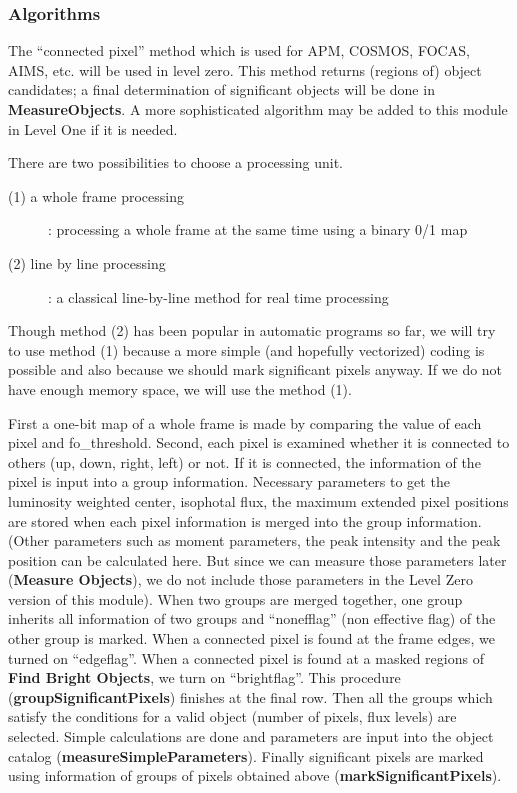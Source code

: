 \subsubsection {Algorithms}
The ``connected pixel'' method which is used for 
APM, COSMOS, FOCAS, AIMS, etc. will be used in level zero. 
This method returns (regions of) object candidates; 
a final determination of significant objects will be done in 
{\bf MeasureObjects}.  
A more sophisticated algorithm may be added to this module in
Level One if it is needed.

There are two possibilities to choose a processing unit.
\begin{description}
\item[\quad (1) a whole frame processing]:  processing a whole 
       frame at the same time using a binary 0/1 map 
\item[\quad (2) line by line processing]: a classical line-by-line 
        method for real time processing
\end{description}

Though method (2) has been popular in automatic programs so far, 
we will try to use method (1) because 
a more simple (and hopefully vectorized) coding is possible and also 
because we should mark significant pixels anyway. If we do not have 
enough memory space, we will use the method (1). 

First a one-bit map of a whole frame is made by comparing the value 
of each pixel and fo\_threshold.
Second, each pixel is examined whether it is connected to others
(up, down, right, left) or not. 
If it is connected, the information of the pixel
is input into a group information. 
Necessary parameters to get the luminosity weighted center, isophotal
flux, the maximum extended pixel positions are stored when each 
pixel information is merged into the group information. 
(Other parameters such as moment parameters, the peak intensity and 
the peak position can be calculated here. But since we can measure those
parameters later ({\bf Measure Objects}), we do not include those parameters
in the Level Zero version of this module).  
When two groups are merged together, one group inherits all information
of two groups and ``nonefflag'' (non effective flag) 
of the other group is marked. 
When a connected pixel is found at the frame edges, 
we turned on ``edgeflag''. When a connected pixel is found at a
masked regions of {\bf Find Bright Objects}, we turn on ``brightflag''. 
This procedure ({\bf groupSignificantPixels}) finishes at the final row.
Then all the groups which satisfy the conditions for a valid object 
(number of pixels, flux levels) are selected. 
Simple calculations are done and parameters are input into
the object catalog ({\bf measureSimpleParameters}).
Finally significant pixels are marked using information of groups of pixels
obtained above ({\bf markSignificantPixels}).

